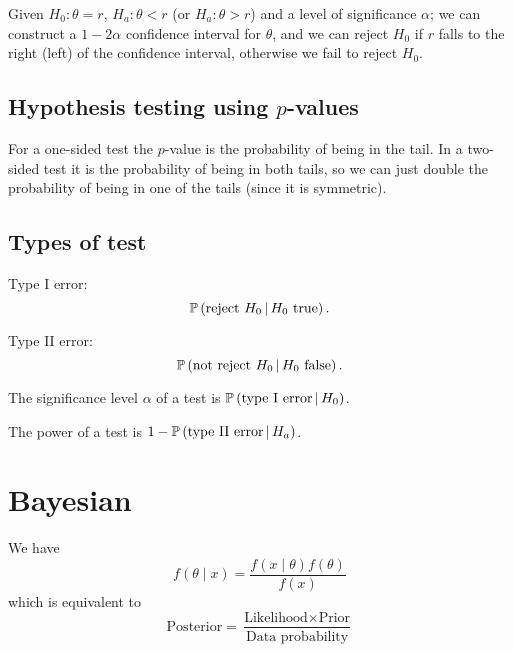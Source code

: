 \documentclass[10pt, a4paper]{article}
\begin{document}
Given $H_0 : \theta = r$,
$H_a : \theta < r$
(or $H_a : \theta > r$)
and a level of significance $\alpha$;
we can construct a $1 - 2\alpha$ confidence interval for $\theta$,
and we can reject $H_0$ if $r$ falls to the right
(left)
of the confidence interval,
otherwise we fail to reject $H_0$.

\subsection{Hypothesis testing using \texorpdfstring{$p$}{}-values}

For a one-sided test the $p$-value is the probability of being in the tail.
In a two-sided test it is the probability of being in both tails,
so we can just double the probability of being in one of the tails
(since it is symmetric).

\subsection{Types of test}
Type I error:
\[
\mathbb{P}\left(\text{reject $H_0$} \,\middle|\, \text{$H_0$ true}\right).
\]

Type II error:
\[
\mathbb{P}\left(\text{not reject $H_0$} \,\middle|\, \text{$H_0$ false}\right).
\]

The significance level $\alpha$ of a test is $\mathbb{P}\left(\text{type I error} \,\middle|\, H_0\right)$.

The power of a test is $1 - \mathbb{P}\left(\text{type II error} \,\middle|\, H_a\right)$.

\newpage

\section{Bayesian}

We have
\[
f(\theta\mid x) = \frac{f(x\mid \theta)f(\theta)}{f(x)}
\]
which is equivalent to
\[
\text{Posterior} = \frac{\text{Likelihood} \times \text{Prior}}{\text{Data probability}}
\]
\end{document}
